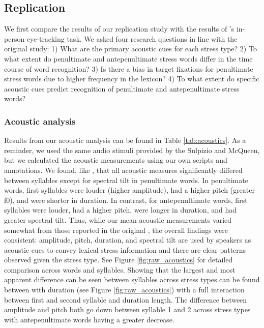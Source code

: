 \subsection{Replication}

We first compare the results of our replication study with the results of \cite{Sulpizio_McQueen_2012}'s in-person eye-tracking task. We asked four research questions in line with the original study: 1) What are the primary acoustic cues for each stress type? 2) To what extent do penultimate and antepenultimate stress words differ in the time course of word recognition? 3) Is there a bias in target fixations for penultimate stress words due to higher frequency in the lexicon? 4) To what extent do specific acoustic cues predict recognition of penultimate and antepenultimate stress words?  

\subsubsection{Acoustic analysis}
Results from our acoustic analysis can be found in Table \ref{tab:acoustics}. As a reminder, we used the same audio stimuli provided by the Sulpizio and McQueen, but we calculated the acoustic measurements using our own scripts and annotations. We found, like \cite{Sulpizio_McQueen_2012}, that all acoustic measures significantly differed between syllables except for spectral tilt in penultimate words. In penultimate words, first syllables were louder (higher amplitude), had a higher pitch (greater f0), and were shorter in duration. In contrast, for antepenultimate words, first syllables were louder, had a higher pitch, were longer in duration, and had greater spectral tilt. Thus, while our mean acoustic measurements varied somewhat from those reported in the original \cite{Sulpizio_McQueen_2012}, the overall findings were consistent: amplitude, pitch, duration, and spectral tilt are used by speakers as acoustic cues to convey lexical stress information and there are clear patterns observed given the stress type. See Figure \ref{fig:raw_acoustics} for detailed comparison across words and syllables. Showing that the largest and most apparent difference can be seen between syllables across stress types can be found between with duration (see Figure \ref{fig:raw_acoustics}) with a full interaction between first and second syllable and duration length. The difference between amplitude and pitch both go down between syllable 1 and 2 across stress types with antepenultimate words having a greater decrease.

